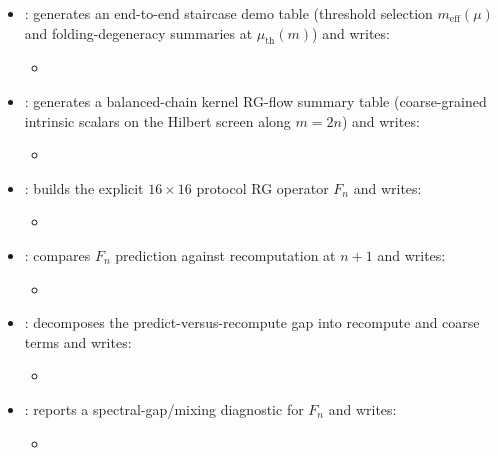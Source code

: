 \begin{sloppypar}
\begin{itemize}
\begin{itemize}
\item {}
\end{itemize}
\item {}: generates an end-to-end staircase demo table (threshold selection $m_{\mathrm{eff}}(\mu)$ and folding-degeneracy summaries at $\mu_{\mathrm{th}}(m)$) and writes:
\begin{itemize}
\item {}
\end{itemize}
\item {}: generates a balanced-chain kernel RG-flow summary table (coarse-grained intrinsic scalars on the Hilbert screen along $m=2n$) and writes:
\begin{itemize}
\item {}
\end{itemize}
\item {}: builds the explicit $16\times 16$ protocol RG operator $F_n$ and writes:
\begin{itemize}
\item {}
\end{itemize}
\item {}: compares $F_n$ prediction against recomputation at $n+1$ and writes:
\begin{itemize}
\item {}
\end{itemize}
\item {}: decomposes the predict-versus-recompute gap into recompute and coarse terms and writes:
\begin{itemize}
\item {}
\end{itemize}
\item {}: reports a spectral-gap/mixing diagnostic for $F_n$ and writes:
\begin{itemize}
\item {}

\end{itemize}
\end{itemize}
\end{sloppypar}
